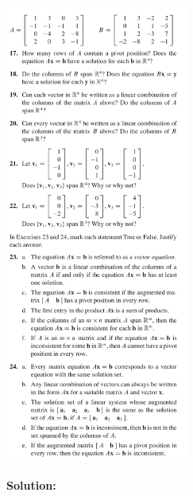 \documentclass[a4paper,11pt,reqno]{amsart}
\numberwithin{equation}{section}
\begin{document}
\includegraphics[width=0.45\textwidth]{exercises/me_3.png}

\newpage

\textbf{Solution:}
\end{document}

